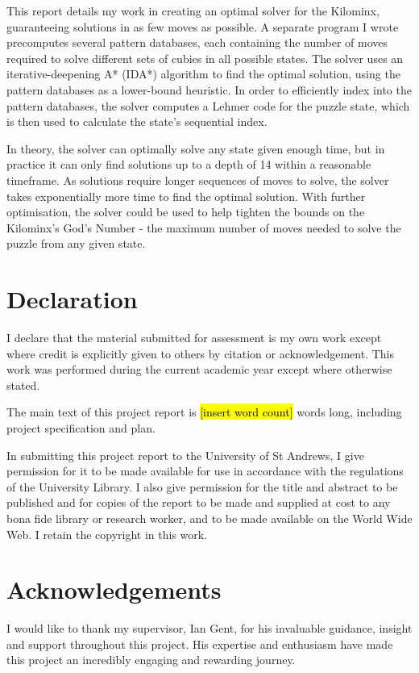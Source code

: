 \documentclass[12pt]{report}
\newcommand{\hlc}[2][yellow]{{%
    \colorlet{foo}{#1}%
    \sethlcolor{foo}\hl{#2}}%
}
\begin{document}
This report details my work in creating an optimal solver for the Kilominx, guaranteeing solutions in as few moves as possible. A separate program I wrote precomputes several pattern databases, each containing the number of moves required to solve different sets of cubies in all possible states. The solver uses an iterative-deepening A* (IDA*) algorithm to find the optimal solution, using the pattern databases as a lower-bound heuristic. In order to efficiently index into the pattern databases, the solver computes a Lehmer code for the puzzle state, which is then used to calculate the state's sequential index.

In theory, the solver can optimally solve any state given enough time, but in practice it can only find solutions up to a depth of 14 within a reasonable timeframe. As solutions require longer sequences of moves to solve, the solver takes exponentially more time to find the optimal solution. With further optimisation, the solver could be used to help tighten the bounds on the Kilominx's God's Number - the maximum number of moves needed to solve the puzzle from any given state.

\chapter*{Declaration}
I declare that the material submitted for assessment is my own work except where credit is explicitly given to others by citation or acknowledgement. This work was performed during the current academic year except where otherwise stated.

The main text of this project report is \hlc[yellow]{[insert word count]} words long, including project specification and plan.

In submitting this project report to the University of St Andrews, I give permission for it to be made available for use in accordance with the regulations of the University Library. I also give permission for the title and abstract to be published and for copies of the report to be made and supplied at cost to any bona fide library or research worker, and to be made available on the World Wide Web. I retain the copyright in this work.

\chapter*{Acknowledgements}
I would like to thank my supervisor, Ian Gent, for his invaluable guidance, insight and support throughout this project. His expertise and enthusiasm have made this project an incredibly engaging and rewarding journey.
\end{document}
